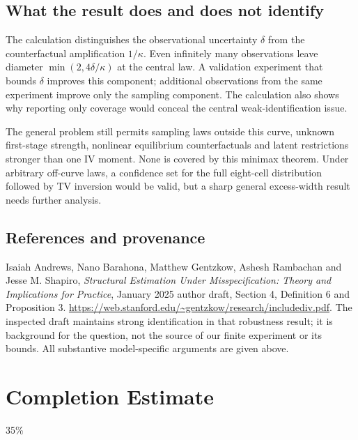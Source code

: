 \documentclass[11pt,a4paper]{article}
\begin{document}
\subsection*{What the result does and does not identify}
The calculation distinguishes the observational uncertainty $\delta$ from the counterfactual amplification $1/\kappa$. Even infinitely many observations leave diameter $\min(2,4\delta/\kappa)$ at the central law. A validation experiment that bounds $\delta$ improves this component; additional observations from the same experiment improve only the sampling component. The calculation also shows why reporting only coverage would conceal the central weak-identification issue.

The general problem still permits sampling laws outside this curve, unknown first-stage strength, nonlinear equilibrium counterfactuals and latent restrictions stronger than one IV moment. None is covered by this minimax theorem. Under arbitrary off-curve laws, a confidence set for the full eight-cell distribution followed by TV inversion would be valid, but a sharp general excess-width result needs further analysis.

\subsection*{References and provenance}
Isaiah Andrews, Nano Barahona, Matthew Gentzkow, Ashesh Rambachan and Jesse M. Shapiro, \emph{Structural Estimation Under Misspecification: Theory and Implications for Practice}, January 2025 author draft, Section 4, Definition 6 and Proposition 3. \url{https://web.stanford.edu/~gentzkow/research/includediv.pdf}. The inspected draft maintains strong identification in that robustness result; it is background for the question, not the source of our finite experiment or its bounds. All substantive model-specific arguments are given above.

\section{Completion Estimate}
35\%
\end{document}
